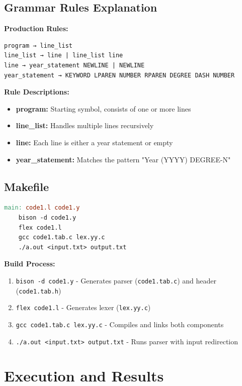 \documentclass[12pt,a4paper]{article}
\begin{document}
\subsection{Grammar Rules Explanation}

\textbf{Production Rules:}
\begin{verbatim}
program → line_list
line_list → line | line_list line
line → year_statement NEWLINE | NEWLINE
year_statement → KEYWORD LPAREN NUMBER RPAREN DEGREE DASH NUMBER
\end{verbatim}

\textbf{Rule Descriptions:}
\begin{itemize}
    \item \textbf{program:} Starting symbol, consists of one or more lines
    \item \textbf{line\_list:} Handles multiple lines recursively
    \item \textbf{line:} Each line is either a year statement or empty
    \item \textbf{year\_statement:} Matches the pattern "Year (YYYY) DEGREE-N"
\end{itemize}

\subsection{Makefile}
\begin{lstlisting}[language=make, caption={Makefile for Building Parser}]
main: code1.l code1.y
	bison -d code1.y
	flex code1.l
	gcc code1.tab.c lex.yy.c
	./a.out <input.txt> output.txt
\end{lstlisting}

\textbf{Build Process:}
\begin{enumerate}
    \item \texttt{bison -d code1.y} - Generates parser (\texttt{code1.tab.c}) and header (\texttt{code1.tab.h})
    \item \texttt{flex code1.l} - Generates lexer (\texttt{lex.yy.c})
    \item \texttt{gcc code1.tab.c lex.yy.c} - Compiles and links both components
    \item \texttt{./a.out <input.txt> output.txt} - Runs parser with input redirection
\end{enumerate}

\section{Execution and Results}
\end{document}
